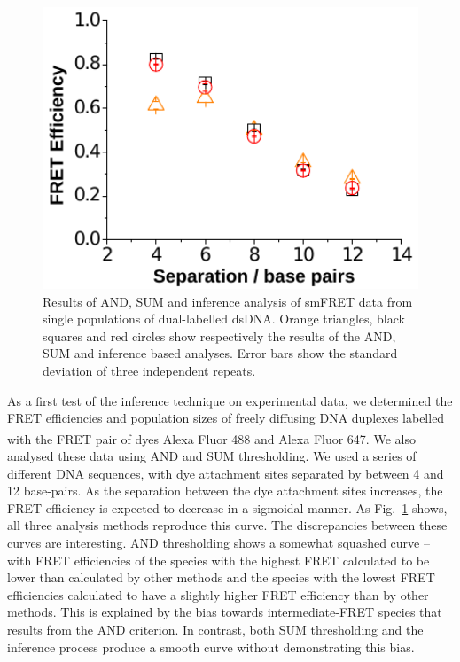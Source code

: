 \begin{figure}
   \begin{center}
      \includegraphics*[width=6in]{inference/fig6_single_ppltn.pdf}
      \caption{Results of AND, SUM and inference analysis of smFRET data from single populations of dual-labelled dsDNA. Orange triangles, black squares and red circles show respectively the results of the AND, SUM and inference based analyses. Error bars show the standard deviation of three independent repeats.}
      \label{fig:fig6_real_single}
   \end{center}
\end{figure}

As a first test of the inference technique on experimental data, we determined the FRET efficiencies and population sizes of freely diffusing DNA duplexes labelled with the FRET pair of dyes Alexa Fluor\textsuperscript{\textregistered} 488 and Alexa Fluor\textsuperscript{\textregistered} 647. We also analysed these data using AND and SUM thresholding. We used a series of different DNA sequences, with dye attachment sites separated by between 4 and 12 base-pairs. As the separation between the dye attachment sites increases, the FRET efficiency is expected to decrease in a sigmoidal manner. As Fig.~\ref{fig:fig6_real_single} shows, all three analysis methods reproduce this curve. The discrepancies between these curves are interesting. AND thresholding shows a somewhat squashed curve -- with FRET efficiencies of the species with the highest FRET calculated to be lower than calculated by other methods and the species with the lowest FRET efficiencies calculated to have a slightly higher FRET efficiency than by other methods. This is explained by the bias towards intermediate-FRET species that results from the AND criterion. In contrast, both SUM thresholding and the inference process produce a smooth curve without demonstrating this bias. 

